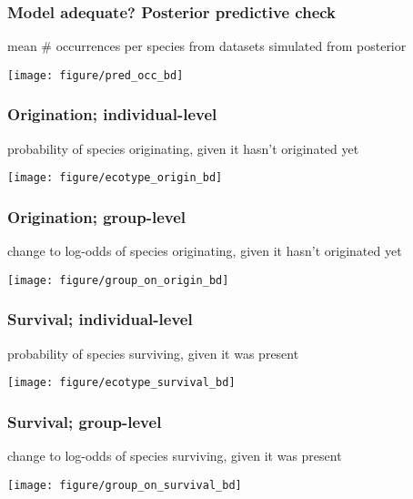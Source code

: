 \documentclass{beamer}
\begin{document}
\begin{frame}
  \frametitle{Model adequate? Posterior predictive check}
  \begin{center}
    mean \# occurrences per species from datasets simulated from posterior

    \texttt{[image: figure/pred\_occ\_bd]}
  \end{center}
\end{frame}

\begin{frame}
  \frametitle{Origination; individual-level}
  \begin{center}
    probability of species originating, given it hasn't originated yet

    \texttt{[image: figure/ecotype\_origin\_bd]}
  \end{center}
\end{frame}

\begin{frame}
  \frametitle{Origination; group-level}
  \begin{center}
    change to log-odds of species originating, given it hasn't originated yet

    \texttt{[image: figure/group\_on\_origin\_bd]}
  \end{center}
\end{frame}

\begin{frame}
  \frametitle{Survival; individual-level}
  \begin{center}
    probability of species surviving, given it was present

    \texttt{[image: figure/ecotype\_survival\_bd]}
  \end{center}
\end{frame}

\begin{frame}
  \frametitle{Survival; group-level}
  \begin{center}
    change to log-odds of species surviving, given it was present

    \texttt{[image: figure/group\_on\_survival\_bd]}
  \end{center}
\end{frame}
\end{document}
